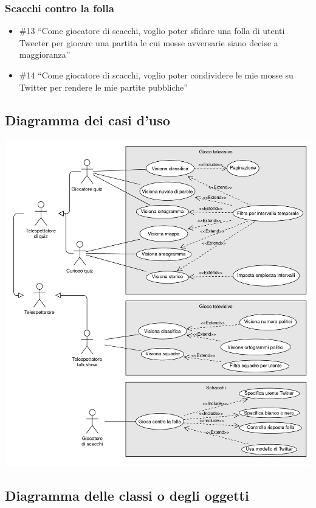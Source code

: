 \documentclass{article}
\begin{document}
\subsubsection{Scacchi contro la folla}

\begin{itemize}
	\item \#13 ``Come giocatore di scacchi, voglio poter sfidare una folla di
	      utenti Tweeter per giocare una partita le cui mosse avversarie siano
	      decise a maggioranza''
	\item \#14 ``Come giocatore di scacchi, voglio poter condividere le mie mosse
	      su Twitter per rendere le mie partite pubbliche''
\end{itemize}

\subsection{Diagramma dei casi d'uso}

\includegraphics[width=\textwidth]{use-cases}

\subsection{Diagramma delle classi o degli oggetti}
\end{document}
